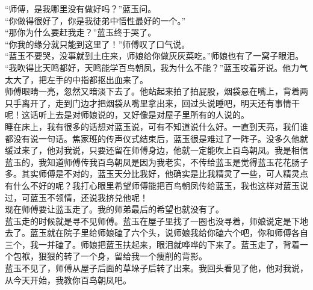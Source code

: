 “师傅，是我哪里没有做好吗？”蓝玉问。\\

“你做得很好了，你是我徒弟中悟性最好的一个。”\\

“那你为什么要赶我走？”蓝玉终于哭了。\\

“你我的缘分就只能到这里了！”师傅叹了口气说。\\

“蓝玉不要哭，没事就到土庄来，师娘给你做灰灰菜吃。”师娘也有了一窝子眼泪。\\

“我吹得比天鸣都好，天鸣能学百鸟朝凤，我为什么不能？”蓝玉咬着牙说。他力气太大了，把左手的中指都抠出血来了。\\

师傅眼睛一亮，忽然又暗淡下去了。他站起来拍了拍屁股，烟袋悬在嘴上，背着两只手离开了，走到门边才把烟袋从嘴里拿出来，回过头说睡吧，明天还有事情干呢！这话听上去是对师娘说的，又好像是对屋子里所有的人说的。\\

睡在床上，我有很多的话想对蓝玉说，可有不知道说什么好。一直到天亮，我们谁都没有说一句话。焦家班的传声仪式结束后，蓝玉很是难过了一阵子。没多久他就缓过来了，他对我说，只要还留在师傅身边，他就一定能吹上百鸟朝凤。我是相信蓝玉的，我知道师傅传我百鸟朝凤是因为我老实，不传给蓝玉是觉得蓝玉花花肠子多。其实师傅是不对的，蓝玉天分比我好，他确实是比我精灵了一些，可人精灵点有什么不好的呢？我打心眼里希望师傅能把百鸟朝凤传给蓝玉，我也这样对蓝玉说过，可蓝玉不领情，还说我挤兑他呢！\\

现在师傅要让蓝玉走了。我的师弟最后的希望也就没有了。\\

蓝玉走的时候就是寻不见师傅。蓝玉在屋子里找了一圈也没寻着，师娘说定是下地去了。蓝玉就在院子里给师娘磕了六个头，说师娘我给你磕六个吧，你和师傅各自三个，我一并磕了。师娘把蓝玉扶起来，眼泪就哗哗的下来了。蓝玉走了，背着一个包袱，狠狠的转了一个身，留给我一个瘦削的背影。\\

蓝玉不见了，师傅从屋子后面的草垛子后转了出来。我回头看见了他，他对我说，从今天开始，我教你百鸟朝凤吧。\\
